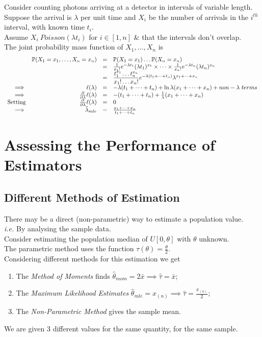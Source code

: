 \documentclass[11pt,a4paper]{article}
\begin{document}
Consider counting photons arriving at a detector in intervals of variable length.\\
Suppose the arrival is $\lambda$ per unit time and $X_i$ be the number of arrivals in the $i^{th}$ interval, with known time $t_i$.\\
Assume $X_i~Poisson(\lambda t_i)$ for $i\in[1,n]$ \& that the intervals don't overlap.\\
The joint probability mass function of $X_1,\dots,X_n$ is
\[\begin{array}{rrcl}
&\prob(X_1=x_1,\dots,X_n=x_n)&=&\prob(X_1=x_1)\dots\prob(X_n=x_n)\\
&&=&\frac{1}{x_1!}e^{-\lambda t_1}(\lambda t_1)^{x_1}\times\dots\times\frac{1}{x_n!}e^{-\lambda t_n}(\lambda t_n)^{x_n}\\
&&=&\dfrac{t_1^{x_1}\dots t_n^{x_n}}{x_1!\dots x_n!}e^{-\lambda(t_1+\dots+t_n)}\lambda^{x_1+\dots+x_n}\\
\implies&\ell(\lambda)&=&-\lambda(t_1+\dots+t_n)+\ln\lambda(x_1+\dots+x_n)+non-\lambda\ terms\\
\implies&\frac{\partial}{\partial\lambda}\ell(\lambda)&=&-(t_1+\dots+t_n)+\frac{1}{\lambda}(x_1+\dots+x_n)\\
\mathrm{Setting}&\frac{\partial}{\partial\lambda}\ell(\lambda)&=&0\\
\implies&\hat{\lambda}_{mle}&=&\frac{x_1+\dots+x_n}{t_1+\dots+t_n}
\end{array}\]

\section{Assessing the Performance of Estimators}

\subsection{Different Methods of Estimation}

There may be a direct (non-parametric) way to estimate a population value.\\
\textit{i.e.} By analysing the sample data.\\

Consider estimating the population median of $U[0,\theta]$ with $\theta$ unknown.\\
The parametric method uses the function $\tau(\theta)=\frac{\theta}{2}$.\\
Considering different methods for this estimation we get
\begin{enumerate}[label=\roman*)]
	\item The \textit{Method of Moments} finds $\hat{\theta}_{mom}=2\bar{x}\implies\hat{\tau}=\bar{x}$;
	\item The \textit{Maximum Likelihood Estimates} $\hat{\theta}_{mle}=x_{(n)}\implies\hat{\tau}=\frac{x_{(n)}}{2}$;
	\item The \textit{Non-Parametric Method} gives the sample mean.
\end{enumerate}
\nb We are given 3 different values for the same quantity, for the same sample.\\
\end{document}
